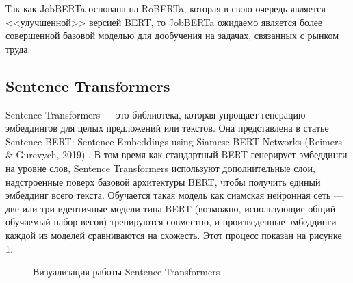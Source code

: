 \documentclass[14pt]{mmcs_article}
\begin{document}
Так как JobBERTa основана на RoBERTa, которая в свою очередь является <<улучшенной>> версией BERT, то JobBERTa ожидаемо является более совершенной базовой моделью для дообучения на задачах, связанных с рынком труда.

\subsection*{Sentence Transformers}\label{sentence_transformers}

Sentence Transformers — это библиотека, которая упрощает генерацию эмбеддингов для целых предложений или текстов. Она представлена в статье Sentence-BERT: Sentence Embeddings using Siamese BERT-Networks (Reimers \& Gurevych, 2019) \cite{reimers2019sentencebertsentenceembeddingsusing}. В том время как стандартный BERT генерирует эмбеддинги на уровне слов, Sentence Transformers используют дополнительные слои, надстроенные поверх базовой архитектуры BERT, чтобы получить единый эмбеддинг всего текста. Обучается такая модель как сиамская нейронная сеть --- две или три идентичные модели типа BERT (возможно, использующие общий обучаемый набор весов) тренируются совместно, и произведенные эмбеддинги каждой из моделей сравниваются на схожесть. Этот процесс показан на рисунке \ref{fig:sentence_transformers_visualization}.

\begin{figure}[h]
  \centering

  \vspace{0.8cm}
  \caption{\centering Визуализация работы Sentence Transformers}
  \label{fig:sentence_transformers_visualization}
\end{figure}
\end{document}
